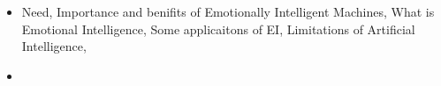 \begin{itemize}
	\item
	Need, Importance and benifits of Emotionally Intelligent Machines, What is Emotional Intelligence, Some applicaitons of EI, Limitations of Artificial Intelligence, \cite{ISSN-2456-2165}
	\item 
	
\end{itemize}